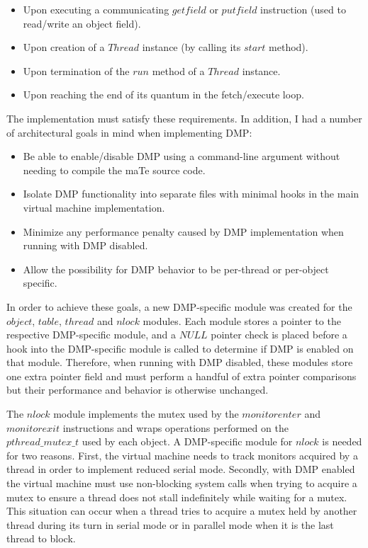 \begin{itemize}
\item Upon executing a communicating $getfield$ or $putfield$
  instruction (used to read/write an object field).
\item Upon creation of a $Thread$ instance (by calling its $start$
  method).
\item Upon termination of the $run$ method of a $Thread$ instance.
\item Upon reaching the end of its quantum in the fetch/execute loop.
\end{itemize}

The implementation must satisfy these requirements.  In addition, I
had a number of architectural goals in mind when implementing DMP:

\begin{itemize}
\item Be able to enable/disable DMP using a command-line argument
  without needing to compile the maTe source code.
\item Isolate DMP functionality into separate files with minimal hooks
  in the main virtual machine implementation.
\item Minimize any performance penalty caused by DMP implementation
  when running with DMP disabled.
\item Allow the possibility for DMP behavior to be per-thread or
  per-object specific.
\end{itemize}

In order to achieve these goals, a new DMP-specific module was created
for the $object$, $table$, $thread$ and $nlock$ modules.  Each module
stores a pointer to the respective DMP-specific module, and a $NULL$
pointer check is placed before a hook into the DMP-specific module is
called to determine if DMP is enabled on that module.  Therefore, when
running with DMP disabled, these modules store one extra pointer field
and must perform a handful of extra pointer comparisons but their
performance and behavior is otherwise unchanged.

The $nlock$ module implements the mutex used by the $monitorenter$ and
$monitorexit$ instructions and wraps operations performed on the
$pthread\_mutex\_t$ used by each object.  A DMP-specific module for
$nlock$ is needed for two reasons.  First, the virtual machine needs
to track monitors acquired by a thread in order to implement reduced
serial mode.  Secondly, with DMP enabled the virtual machine must use
non-blocking system calls when trying to acquire a mutex to ensure a
thread does not stall indefinitely while waiting for a mutex.  This
situation can occur when a thread tries to acquire a mutex held by
another thread during its turn in serial mode or in parallel mode when
it is the last thread to block.

